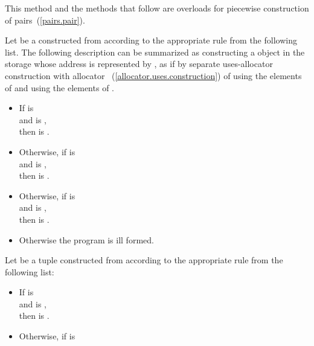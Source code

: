 \begin{itemdescr}
\pnum
\enternote
This method and the  methods that follow
are overloads for piecewise construction of pairs~(\ref{pairs.pair}).
\exitnote

\pnum
\effects
Let  be a  constructed from 
according to the appropriate rule from the following list.
\enternote
The following description can be summarized as
constructing a  object
in the storage whose address is represented by ,
as if by separate uses-allocator construction
with allocator ~(\ref{allocator.uses.construction})
of  using the elements of 
and  using the elements of .
\exitnote
\begin{itemize}
\item
If  is 
\\
and
 is ,
\\
then  is .
\item
Otherwise, if  is 
\\
and
 is ,
\\
then  is .
\item
Otherwise, if  is 
\\
and
 is ,
\\
then  is .
\item
Otherwise the program is ill formed.
\end{itemize}
Let  be a tuple constructed from 
according to the appropriate rule from the following list:
\begin{itemize}
\item
If  is 
\\
and
 is ,
\\
then  is .
\item
Otherwise, if  is 

\end{itemize}
\end{itemdescr}
